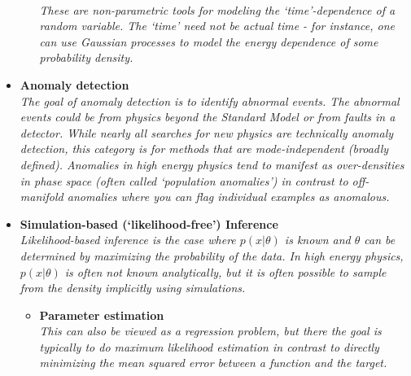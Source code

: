 \documentclass[12pt,letterpaper]{article}
\begin{document}
\begin{itemize}
\begin{itemize}
		\\\textit{These are non-parametric tools for modeling the `time'-dependence of a random variable.  The `time' need not be actual time - for instance, one can use Gaussian processes to model the energy dependence of some probability density.}
	\end{itemize}
\item \textbf{Anomaly detection}~\cite{DAgnolo:2018cun,Collins:2018epr,Collins:2019jip,DAgnolo:2019vbw,Farina:2018fyg,Heimel:2018mkt,Roy:2019jae,Cerri:2018anq,Blance:2019ibf,Hajer:2018kqm,DeSimone:2018efk,Mullin:2019mmh,1809.02977,Dillon:2019cqt,Andreassen:2020nkr,Nachman:2020lpy,Aguilar-Saavedra:2017rzt,Romao:2019dvs,Romao:2020ojy,knapp2020adversarially,collaboration2020dijet,1797846,1800445,Amram:2020ykb,Cheng:2020dal,Khosa:2020qrz,Thaprasop:2020mzp,Alexander:2020mbx,aguilarsaavedra2020mass,1815227,pol2020anomaly,Mikuni:2020qds,vanBeekveld:2020txa,Park:2020pak,Faroughy:2020gas,Stein:2020rou,Kasieczka:2021xcg,Chakravarti:2021svb,Batson:2021agz,Blance:2021gcs,Bortolato:2021zic,Collins:2021nxn,Dillon:2021nxw,Finke:2021sdf}
\\\textit{The goal of anomaly detection is to identify abnormal events.  The abnormal events could be from physics beyond the Standard Model or from faults in a detector.  While nearly all searches for new physics are technically anomaly detection, this category is for methods that are mode-independent (broadly defined).  Anomalies in high energy physics tend to manifest as over-densities in phase space (often called `population anomalies') in contrast to off-manifold anomalies where you can flag individual examples as anomalous. }
\item \textbf{Simulation-based (`likelihood-free') Inference}
\\\textit{Likelihood-based inference is the case where $p(x|\theta)$ is known and $\theta$ can be determined by maximizing the probability of the data.  In high energy physics, $p(x|\theta)$ is often not known analytically, but it is often possible to sample from the density implicitly using simulations.}
	\begin{itemize}
		\item \textbf{Parameter estimation}~\cite{Andreassen:2019nnm,Stoye:2018ovl,Hollingsworth:2020kjg,Brehmer:2018kdj,Brehmer:2018eca,Brehmer:2019xox,Brehmer:2018hga,Cranmer:2015bka,Andreassen:2020gtw,Coogan:2020yux,Flesher:2020kuy,Bieringer:2020tnw,Nachman:2021yvi}
		\\\textit{This can also be viewed as a regression problem, but there the goal is typically to do maximum likelihood estimation in contrast to directly minimizing the mean squared error between a function and the target.}

\end{itemize}
\end{itemize}
\end{document}
